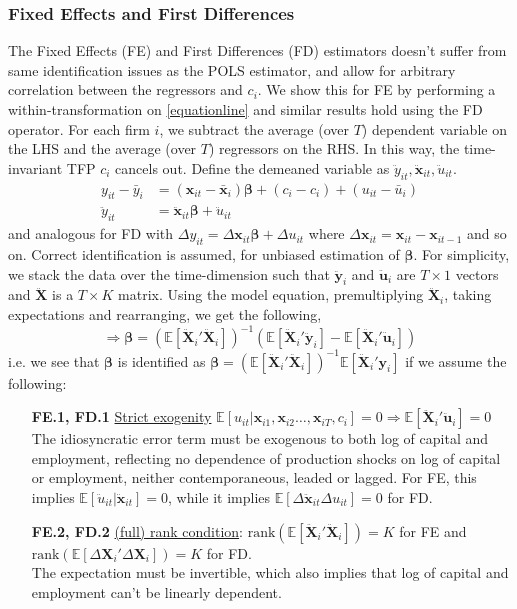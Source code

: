 \subsubsection*{Fixed Effects and First Differences}
The Fixed Effects (FE) and First Differences (FD) estimators doesn't suffer from same identification issues as the POLS estimator, and allow for arbitrary correlation between the regressors and $c_i$. We show this for FE by performing a within-transformation on \eqref{equationline} and similar results hold using the FD operator. For each firm $i$, we subtract the average (over $T$) dependent variable  on the LHS and the average (over $T$) regressors on the RHS. In this way, the time-invariant TFP $c_i$ cancels out. Define the demeaned variable as $ \ddot{y}_{it}, \pmb{\ddot{x}}_{it}, \ddot{u}_{it}$.
\begin{align*}
    y_{it}-\bar{y}_{i} &=(\pmb{x}_{it}-\bar{\pmb{x}}_{i}) \pmb{\beta}+(c_i-c_i)+(u_{it} - \bar{u}_{i}) \\
    \ddot{y}_{it} &=  \ddot{\pmb{x}}_{it} \pmb{\beta}+\ddot{u}_{it}
\end{align*}
and analogous for FD with $\Delta y_{it}=\Delta \pmb{x}_{it}\pmb{\beta}+\Delta u_{it}$ where $\Delta \pmb{x}_{it}=\pmb{x}_{it}-\pmb{x}_{it-1}$ and so on. Correct identification is assumed, for unbiased estimation of $\pmb{\beta}$. For simplicity, we stack the data over the time-dimension such that $\ddot{\pmb{y}}_{i}$ and $\ddot{\pmb{u}}_{i}$ are $T \times 1$ vectors and $\pmb{\ddot{X}}$ is a $T\times K$ matrix. Using the model equation, premultiplying $\pmb{\ddot{X}}_{i}$, taking expectations and rearranging, we get the following,
$$ \Rightarrow  \pmb{\beta} = (\mathbb{E}[\pmb{\ddot{X}}_{i}'\pmb{\ddot{X}}_{i}])^{-1} \left(  \mathbb{E}[\pmb{\ddot{X}}_{i}'\pmb{\ddot{y}}_{i}]-\mathbb{E}[\pmb{\ddot{X}}_{i}' \pmb{\ddot{u}}_{i}]\right)$$
i.e. we see that $\pmb{\beta}$ is identified as $\pmb{\beta} = (\mathbb{E}[\pmb{\ddot{X}}_{i}'\pmb{\ddot{X}}_{i}])^{-1} \mathbb{E}[\pmb{\ddot{X}}_{i}'\pmb{y}_{i}]$ if we assume the following:
\begin{enumerate}
    \item[\textbf{FE.1, FD.1}] \underline{Strict exogenity} $\mathbb{E}[u_{it}\vert \pmb{x}_{i1},\pmb{x}_{i2}\dots,\pmb{x}_{iT},c_i]=0\Rightarrow \mathbb{E}[\pmb{\ddot{X}}_{i}' \pmb{\ddot{u}}_{i}]=0$ \\
    The idiosyncratic error term must be exogenous to both log of capital and employment, reflecting no dependence of production shocks on log of capital or employment, neither contemporaneous, leaded or lagged. For FE, this implies $\mathbb{E}[ \ddot{u}_{it} \vert\pmb{\ddot{x}}_{it}]=0$, while it implies $\mathbb{E}[\Delta \pmb{\ddot{x}}_{it} \Delta u_{it}]=0$ for FD. 
    \item[\textbf{FE.2, FD.2}] \underline{ (full) rank condition}: $\text{rank}(\mathbb{E}[\pmb{\ddot{X}}_{i}'\pmb{\ddot{X}}_{i}])=K$ for FE and $\text{rank}(\mathbb{E}[\Delta\pmb{X}_{i}' \Delta\pmb{X}_{i}])=K$ for FD. \\
    The expectation must be invertible, which also implies that log of capital and employment can't be linearly dependent.
\end{enumerate}

